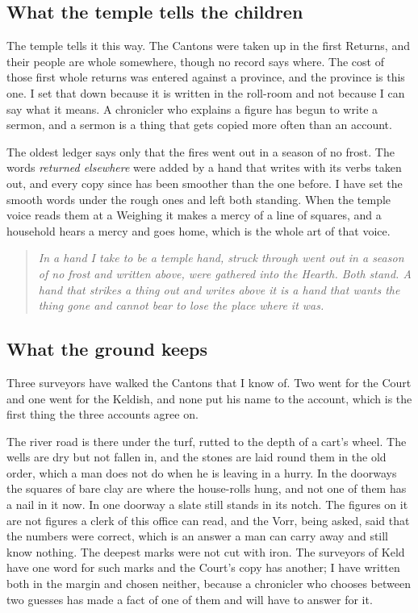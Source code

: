 \documentclass{design/chronicle}
\begin{document}
\subsection*{What the temple tells the children}

The temple tells it this way. The Cantons were taken up in the first Returns, and their people are whole somewhere, though no record says where. The cost of those first whole returns was entered against a province, and the province is this one. I set that down because it is written in the roll-room and not because I can say what it means. A chronicler who explains a figure has begun to write a sermon, and a sermon is a thing that gets copied more often than an account.

The oldest ledger says only that the fires went out in a season of no frost. The words \emph{returned elsewhere} were added by a hand that writes with its verbs taken out, and every copy since has been smoother than the one before. I have set the smooth words under the rough ones and left both standing. When the temple voice reads them at a Weighing it makes a mercy of a line of squares, and a household hears a mercy and goes home, which is the whole art of that voice.

\begin{quote}\itshape \emph{In a hand I take to be a temple hand, struck through} went out in a season of no frost \emph{and written above,} were gathered into the Hearth. \emph{Both stand. A hand that strikes a thing out and writes above it is a hand that wants the thing gone and cannot bear to lose the place where it was.}\end{quote}

\subsection*{What the ground keeps}

Three surveyors have walked the Cantons that I know of. Two went for the Court and one went for the Keldish, and none put his name to the account, which is the first thing the three accounts agree on.

The river road is there under the turf, rutted to the depth of a cart’s wheel. The wells are dry but not fallen in, and the stones are laid round them in the old order, which a man does not do when he is leaving in a hurry. In the doorways the squares of bare clay are where the house-rolls hung, and not one of them has a nail in it now. In one doorway a slate still stands in its notch. The figures on it are not figures a clerk of this office can read, and the Vorr, being asked, said that the numbers were correct, which is an answer a man can carry away and still know nothing. The deepest marks were not cut with iron. The surveyors of Keld have one word for such marks and the Court’s copy has another; I have written both in the margin and chosen neither, because a chronicler who chooses between two guesses has made a fact of one of them and will have to answer for it.
\end{document}
